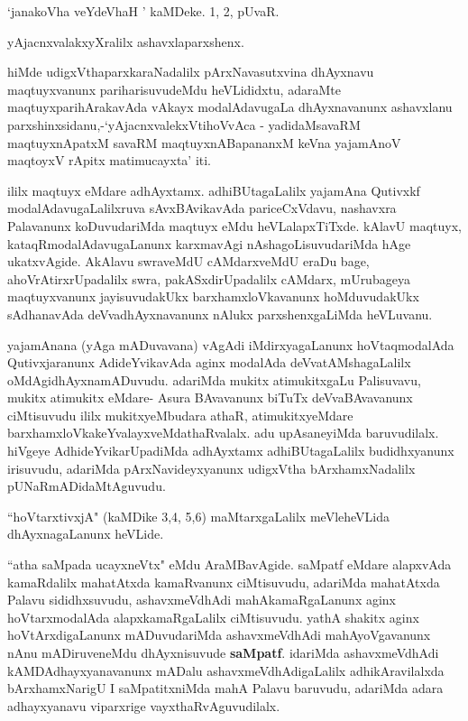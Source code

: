 \begin{artha}
`janakoVha veYdeVhaH \mdash ' kaMDeke. 1, 2, pUvaR.

yAjacnxvalakxyXralilx ashavxlaparxshenx.

hiMde udigxVthaparxkaraNadalilx pArxNavasutxvina dhAyxnavu maqtuyxvanunx 
pariharisuvudeMdu heVLididxtu, adaraMte maqtuyxparihArakavAda vAkayx modalAdavugaLa 
dhAyxnavanunx ashavxlanu parxshinxsidanu,-`yAjacnxvalekxVtihoVvAca - yadidaMsavaRM maqtuyxnA\s\s patxM savaRM maqtuyxnA\s BapananxM keVna yajamAnoV maqtoyxV rApitx matimucayxta' iti.

ililx maqtuyx eMdare adhAyxtamx. adhiBUtagaLalilx yajamAna Qutivxkf 
modalAdavugaLalilxruva sAvxBAvikavAda pariceCxVdavu, nashavxra Palavanunx koDuvudariMda 
maqtuyx eMdu heVLalapxTiTxde. kAlavU maqtuyx, kataqRmodalAdavugaLanunx karxmavAgi 
nAshagoLisuvudariMda hAge ukatxvAgide. AkAlavu swraveMdU cAMdarxveMdU eraDu bage, 
ahoVrAtirxrUpadalilx swra, pakASxdirUpadalilx cAMdarx, mUrubageya maqtuyxvanunx 
jayisuvudakUkx barxhamxloVkavanunx hoMduvudakUkx sAdhanavAda deVvadhAyxnavanunx nAlukx 
parxshenxgaLiMda heVLuvanu.
\end{artha}

\centerline{}

\begin{artha}
yajamAnana (yAga mADuvavana) vAgAdi iMdirxyagaLanunx hoVtaqmodalAda Qutivxjaranunx AdideYvikavAda aginx modalAda deVvatAMshagaLalilx oMdAgidhAyxnamADuvudu. adariMda mukitx atimukitxgaLu Palisuvavu, mukitx atimukitx eMdare- Asura BAvavanunx biTuTx deVvaBAvavanunx ciMtisuvudu ililx mukitxyeMbudara athaR, atimukitxyeMdare barxhamxloVkakeYvalayxveMdathaRvalalx. adu upAsaneyiMda baruvudilalx. hiVgeye AdhideYvikarUpadiMda adhAyxtamx adhiBUtagaLalilx budidhxyanunx irisuvudu, adariMda pArxNavideyxyanunx udigxVtha bArxhamxNadalilx pUNaRmADidaMtAguvudu.
\end{artha}

\begin{artha}
``hoVtarxtivxjA" (kaMDike 3,4, 5,6) maMtarxgaLalilx meVleheVLida dhAyxnagaLanunx heVLide.
\end{artha}

\centerline{}

\begin{artha}
``atha saMpada ucayxneVtx" eMdu AraMBavAgide. saMpatf eMdare alapxvAda kamaRdalilx mahatAtxda kamaRvanunx ciMtisuvudu, adariMda mahatAtxda Palavu sididhxsuvudu, ashavxmeVdhAdi mahAkamaRgaLanunx aginx hoVtarxmodalAda alapxkamaRgaLalilx ciMtisuvudu.  yathA shakitx aginx hoVtArxdigaLanunx mADuvudariMda ashavxmeVdhAdi mahAyoVgavanunx nAnu mADiruveneMdu dhAyxnisuvude \textbf{saMpatf}. idariMda ashavxmeVdhAdi kAMDAdhayxyanavanunx mADalu ashavxmeVdhAdigaLalilx adhikAravilalxda bArxhamxNarigU I saMpatitxniMda mahA Palavu baruvudu, adariMda adara adhayxyanavu viparxrige vayxthaRvAguvudilalx.
\end{artha}

